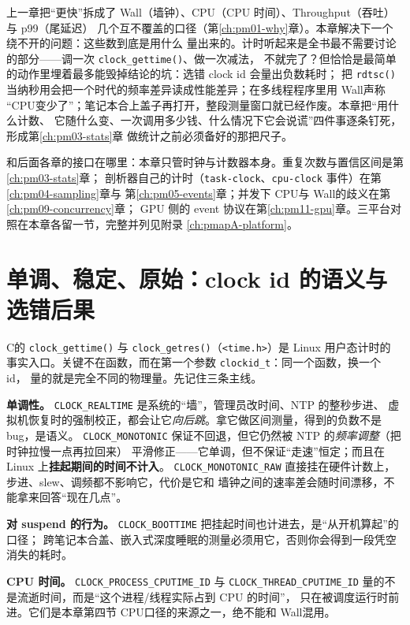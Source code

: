 \documentclass[12pt,a4paper,fontset=fandol]{ctexbook}
\newcommand{\Fn}[1]{\texttt{#1()}}
\newcommand{\Tp}[1]{\texttt{#1}}
\newcommand{\Bk}{\discretionary{}{}{}}
\newcommand{\Lang}[1]{\textsf{#1}}
\newcommand{\CL}{\Lang{C}}
\newcommand{\MWall}{\Lang{Wall}}
\newcommand{\MCpu}{\Lang{CPU}}
\newcommand{\MThr}{\Lang{Throughput}}
\newcommand{\Mx}[1]{\textsf{#1}}
\begin{document}
上一章把``更快''拆成了 \MWall（墙钟）、\MCpu（CPU 时间）、\MThr（吞吐）与 \Mx{p99}（尾延迟）
几个互不覆盖的口径（第\ref{ch:pm01-why}章）。本章解决下一个绕不开的问题：这些数到底是用什么
量出来的。计时听起来是全书最不需要讨论的部分——调一次 \Fn{clock{\Bk}\_gettime}、做一次减法，
不就完了？但恰恰是最简单的动作里埋着最多能毁掉结论的坑：选错 clock id 会量出负数耗时；
把 \Fn{rdtsc} 当纳秒用会把一个时代的频率差异读成性能差异；在多线程程序里用 \MWall 声称
``\MCpu 变少了''；笔记本合上盖子再打开，整段测量窗口就已经作废。本章把``用什么计数、
它随什么变、一次调用多少钱、什么情况下它会说谎''四件事逐条钉死，形成第\ref{ch:pm03-stats}章
做统计之前必须备好的那把尺子。

和后面各章的接口在哪里：本章只管时钟与计数器本身。重复次数与置信区间是第\ref{ch:pm03-stats}章；
剖析器自己的计时（\Tp{task-clock}、\Tp{cpu-clock} 事件）在第\ref{ch:pm04-sampling}章与
第\ref{ch:pm05-events}章；并发下 \MCpu 与 \MWall 的歧义在第\ref{ch:pm09-concurrency}章；
GPU 侧的 event 协议在第\ref{ch:pm11-gpu}章。三平台对照在本章各留一节，完整并列见附录
\ref{ch:pmapA-platform}。

\section{单调、稳定、原始：clock id 的语义与选错后果}
\label{sec:pm02-clockid}

\CL 的 \Fn{clock{\Bk}\_gettime} 与 \Fn{clock{\Bk}\_getres}（\Tp{<time.h>}）是 Linux 用户态计时的
事实入口。关键不在函数，而在第一个参数 \Tp{clockid{\Bk}\_t}：同一个函数，换一个 id，
量的就是完全不同的物理量。先记住三条主线。

\textbf{单调性。} \Tp{CLOCK{\Bk}\_REALTIME} 是系统的``墙''，管理员改时间、NTP 的整秒步进、
虚拟机恢复时的强制校正，都会让它\emph{向后跳}。拿它做区间测量，得到的负数不是 bug，是语义。
\Tp{CLOCK{\Bk}\_MONOTONIC} 保证不回退，但它仍然被 NTP 的\emph{频率调整}（把时钟拉慢一点再拉回来）
平滑修正——它单调，但不保证``走速''恒定；而且在 Linux 上\textbf{挂起期间的时间不计入}。
\Tp{CLOCK{\Bk}\_MONOTONIC{\Bk}\_RAW} 直接挂在硬件计数上，步进、slew、调频都不影响它，代价是它和
墙钟之间的速率差会随时间漂移，不能拿来回答``现在几点''。

\textbf{对 suspend 的行为。} \Tp{CLOCK{\Bk}\_BOOTTIME} 把挂起时间也计进去，是``从开机算起''的口径；
跨笔记本合盖、嵌入式深度睡眠的测量必须用它，否则你会得到一段凭空消失的耗时。

\textbf{CPU 时间。} \Tp{CLOCK{\Bk}\_PROCESS{\Bk}\_CPUTIME{\Bk}\_ID} 与
\Tp{CLOCK{\Bk}\_THREAD{\Bk}\_CPUTIME{\Bk}\_ID} 量的不是流逝时间，而是``这个进程/线程实际占到 CPU 的时间''，
只在被调度运行时前进。它们是本章第四节 \MCpu 口径的来源之一，绝不能和 \MWall 混用。
\end{document}
